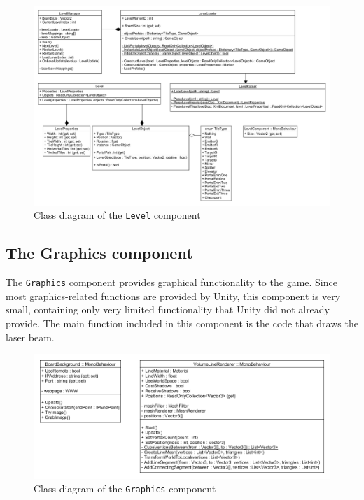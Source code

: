             \begin{figure}[ht]
				\includegraphics[width=\textwidth]{ClassDiagramLevel}
				\caption{Class diagram of the \texttt{Level} component}
				\label{fig:classdiagramlevel}
			\end{figure}
			
		\subsection{The Graphics component}
			The \texttt{Graphics} component provides graphical functionality to 
            the game. Since most graphics-related functions are provided by 
            Unity, this component is very small, containing only very limited 
            functionality that Unity did not already provide. The main 
            function included in this component is the code that draws the laser 
            beam.

            \begin{figure}[ht]
				\includegraphics[width=\textwidth]{ClassDiagramGraphics}
				\caption{Class diagram of the \texttt{Graphics} component}
				\label{fig:classdiagramgraphics}
			\end{figure}

